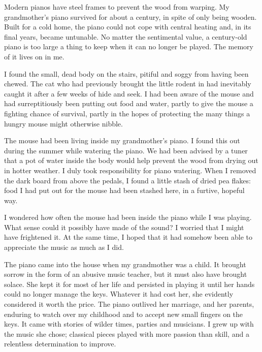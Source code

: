 

\prelude

Modern pianos have steel frames to prevent the wood from warping. My
grandmother's piano survived for about a century, in spite of only
being wooden. Built for a cold home, the piano could not cope with
central heating and, in its final years, became untunable. No matter
the sentimental value, a century-old piano is too large a thing to
keep when it can no longer be played. The memory of it lives on in me.

\fugue

I found the small, dead body on the stairs, pitiful and soggy from
having been chewed. The cat who had previously brought the little
rodent in had inevitably caught it after a few weeks of hide and
seek. I had been aware of the mouse and had surreptitiously been
putting out food and water, partly to give the mouse a fighting chance
of survival, partly in the hopes of protecting the many things a
hungry mouse might otherwise nibble.

The mouse had been living inside my grandmother's piano. I found this
out during the summer while watering the piano. We had been advised by
a tuner that a pot of water inside the body would help prevent the
wood from drying out in hotter weather. I duly took responsibility for
piano watering. When I removed the dark board from above the pedals, I
found a little stash of dried pea flakes: food I had put out for the
mouse had been stashed here, in a furtive, hopeful way.

I wondered how often the mouse had been inside the piano while I was
playing. What sense could it possibly have made of the sound? I
worried that I might have frightened it. At the same time, I hoped
that it had somehow been able to appreciate the music as much as I
did.

The piano came into the house when my grandmother was a child. It
brought sorrow in the form of an abusive music teacher, but it must
also have brought solace. She kept it for most of her life and
persisted in playing it until her hands could no longer manage the
keys. Whatever it had cost her, she evidently considered it worth the
price. The piano outlived her marriage, and her parents, enduring to
watch over my childhood and to accept new small fingers on the
keys. It came with stories of wilder times, parties and musicians. I
grew up with the music she chose; classical pieces played with more
passion than skill, and a relentless determination to improve.


